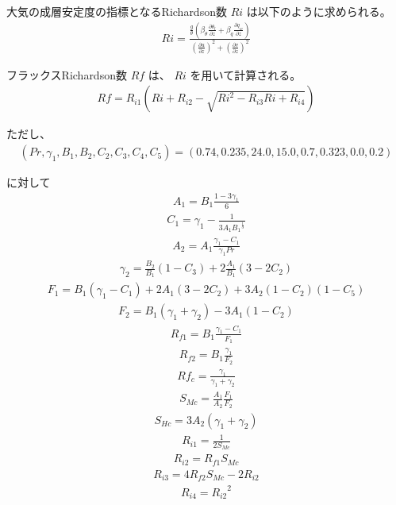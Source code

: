 大気の成層安定度の指標となるRichardson数 \(Ri\)
は以下のように求められる。
\begin{eqnarray}Ri=\frac{\frac{g}{\theta}\left(\beta_\theta \frac{\partial \theta_l}{\partial z}+\beta_q \frac{\partial q_w}{\partial z}\right)}{\left(\frac{\partial u}{\partial z}\right)^2+\left(\frac{\partial v}{\partial z}\right)^2}\end{eqnarray}

フラックスRichardson数 \(Rf\) は、 \(Ri\) を用いて計算される。
\begin{eqnarray}Rf=R_{i1}\left(Ri+R_{i2}-\sqrt{Ri^2-R_{i3}Ri+R_{i4}}\right)\end{eqnarray}

ただし、
\begin{eqnarray}(Pr,\gamma_1,B_1,B_2,C_2,C_3,C_4,C_5)=(0.74,0.235,24.0,15.0,0.7,0.323,0.0,0.2)\end{eqnarray}

に対して \begin{eqnarray}A_1=B_1\frac{1-3\gamma_1}{6}\end{eqnarray}
\begin{eqnarray}C_1=\gamma_1-\frac{1}{3A_1{B_1}^{\frac{1}{3}}}\end{eqnarray}
\begin{eqnarray}A_2=A_1\frac{\gamma_1-C_1}{\gamma_1 Pr}\end{eqnarray}
\begin{eqnarray}\gamma_2=\frac{B_2}{B_1}\left(1-C_3\right)+2\frac{A_1}{B_1}\left(3-2C_2\right)\end{eqnarray}
\begin{eqnarray}F_1=B_1(\gamma_1-C_1)+2A_1(3-2C_2)+3A_2(1-C_2)(1-C_5)\end{eqnarray}
\begin{eqnarray}F_2=B_1(\gamma_1+\gamma_2)-3A_1(1-C_2)\end{eqnarray}
\begin{eqnarray}R_{f1}=B_1\frac{\gamma_1-C_1}{F_1}\end{eqnarray}
\begin{eqnarray}R_{f2}=B_1\frac{\gamma_1}{F_2}\end{eqnarray}
\begin{eqnarray}Rf_c=\frac{\gamma_1}{\gamma_1+\gamma_2}\end{eqnarray}
\begin{eqnarray}S_{Mc}=\frac{A_1}{A_2}\frac{F_1}{F_2}\end{eqnarray}
\begin{eqnarray}S_{Hc}=3A_2(\gamma_1+\gamma_2)\end{eqnarray} \begin{eqnarray}R_{i1}=\frac{1}{2S_{Mc}}\end{eqnarray}
\begin{eqnarray}R_{i2}=R_{f1}S_{Mc}\end{eqnarray} \begin{eqnarray}R_{i3}=4R_{f2}S_{Mc}-2R_{i2}\end{eqnarray}
\begin{eqnarray}R_{i4}={R_{i2}}^2\end{eqnarray}


